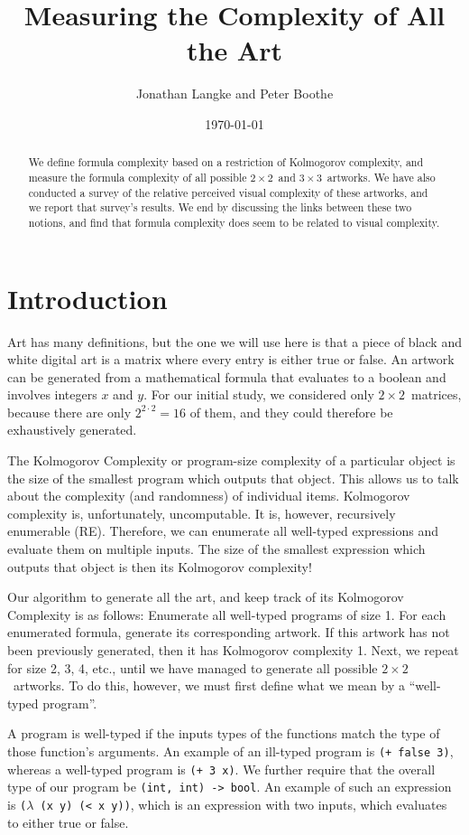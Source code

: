 \documentclass[11pt]{article}
\title{Measuring the Complexity of All the Art}
\author{Jonathan Langke and Peter Boothe}
\date{\today}
\newcommand{\twoxtwo}{$2\times2$}
\newcommand{\threexthree}{$3\times3$}
\begin{document}
\maketitle

\begin{abstract}
We define formula complexity based on a restriction of Kolmogorov complexity,
and measure the formula complexity of all possible \twoxtwo\ and \threexthree\
artworks.  We have also conducted a survey of the relative perceived visual
complexity of these artworks, and we report that survey's results.  We end by
discussing the links between these two notions, and find that formula
complexity does seem to be related to visual complexity.
\end{abstract}

\section{Introduction}

Art has many definitions, but the one we will use here is that a piece of black
and white digital art is a matrix where every entry is either true or false.
An artwork can be generated from a mathematical formula that evaluates to a
boolean and involves integers $x$ and $y$.  For our initial study, we
considered only \twoxtwo\ matrices, because there are only $2^{2\cdot2} = 16$
of them, and they could therefore be exhaustively generated.

The Kolmogorov Complexity or program-size complexity of a particular object is
the size of the smallest program which outputs that object.  This allows us to
talk about the complexity (and randomness) of individual items.  Kolmogorov
complexity is, unfortunately, uncomputable.  It is, however, recursively
enumerable (RE).  Therefore, we can enumerate all well-typed expressions and
evaluate them on multiple inputs.  The size of the smallest expression which
outputs that object is then its Kolmogorov complexity!

Our algorithm to generate all the art, and keep track of its Kolmogorov
Complexity is as follows: Enumerate all well-typed programs of size 1.  For
each enumerated formula, generate its corresponding artwork.  If this artwork
has not been previously generated, then it has Kolmogorov complexity 1.  Next,
we repeat for size 2, 3, 4, etc., until we have managed to generate all
possible \twoxtwo\ artworks.  To do this, however, we must first define what we
mean by a ``well-typed program''.

A program is well-typed if the inputs types of the functions match the type of
those function's arguments.  An example of an ill-typed program is {\tt (+
false 3)}, whereas a well-typed program is {\tt (+ 3 x)}.  We further require
that the overall type of our program be {\tt (int, int) -> bool}.  An example
of such an expression is {\tt ($\lambda$ (x y) (< x y))}, which is an
expression with two inputs, which evaluates to either true or false.
\end{document}
